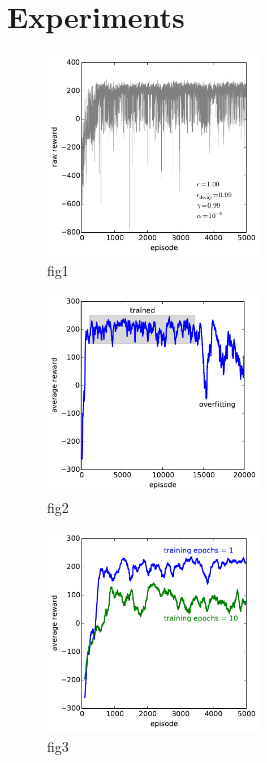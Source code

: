 \documentclass[conference]{IEEEtran}
\begin{document}
\section{Experiments}
\begin{figure}[tbp]
    \centering
    \includegraphics[width=0.5\textwidth]{./figures/fig1.pdf}
    \caption{fig1}
\end{figure}

\begin{figure}[tbp]
    \centering
    \includegraphics[width=0.5\textwidth]{./figures/fig2.pdf}
    \caption{fig2}
\end{figure}

\begin{figure}[tbp]
    \centering
    \includegraphics[width=0.5\textwidth]{./figures/fig3.pdf}
    \caption{fig3}
\end{figure}
\end{document}
